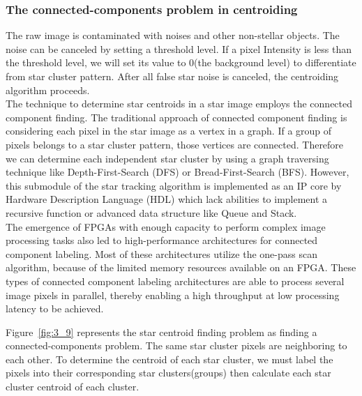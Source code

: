 
\subsubsection{The connected-components problem in centroiding}

The raw image is contaminated with noises and other non-stellar objects. The noise can be canceled by setting a threshold level. If a pixel Intensity is less than the threshold level, we will set its value to 0(the background level) to differentiate from star cluster pattern. After all false star noise is canceled, the centroiding algorithm proceeds. \\

\noindent The technique to determine star centroids in a star image employs the connected component finding. The traditional approach of connected component finding is considering each pixel in the star image as a vertex in a graph. If a group of pixels belongs to a star cluster pattern, those vertices are connected. Therefore we can determine each independent star cluster by using a graph traversing technique like Depth-First-Search (DFS) or Bread-First-Search (BFS). However, this submodule of the star tracking algorithm is implemented as an IP core by Hardware Description Language (HDL) which lack abilities to implement a recursive function or advanced data structure like Queue and Stack. \\

\noindent The emergence of FPGAs with enough capacity to perform complex image processing tasks also led to high-performance architectures for connected component labeling\cite{CCA}. Most of these architectures utilize the one-pass scan algorithm, because of the limited memory resources available on an FPGA. These types of connected component labeling architectures are able to process several image pixels in parallel, thereby enabling a high throughput at low processing latency to be achieved\cite{000384075100011n.d.}. \\


\noindent Figure~\ref{fig:3_9} represents the star centroid finding problem as finding a connected-components problem. The same star cluster pixels are neighboring to each other. To determine the centroid of each star cluster, we must label the pixels into their corresponding star clusters(groups) then calculate each star cluster centroid of each cluster. \\

